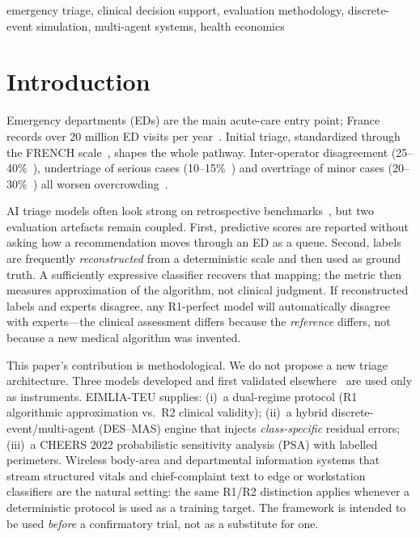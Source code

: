 \documentclass[conference]{IEEEtran}
\begin{document}
\begin{IEEEkeywords}
emergency triage, clinical decision support, evaluation methodology, discrete-event simulation, multi-agent systems, health economics
\end{IEEEkeywords}

\section{Introduction}
Emergency departments (EDs) are the main acute-care entry point; France records over 20 million ED visits per year~\cite{drees2023}. Initial triage, standardized through the FRENCH scale~\cite{taboulet2009,taboulet2019}, shapes the whole pathway. Inter-operator disagreement (25--40\%~\cite{farrohknia2011,parenti2014,zaboli2024}), undertriage of serious cases (10--15\%~\cite{ebrahimi2015,sax2026}) and overtriage of minor cases (20--30\%~\cite{christ2010}) all worsen overcrowding~\cite{demoly2025,moll2010}.

AI triage models often look strong on retrospective benchmarks~\cite{levin2018,hong2018,klang2020}, but two evaluation artefacts remain coupled. First, predictive scores are reported without asking how a recommendation moves through an ED as a queue. Second, labels are frequently \emph{reconstructed} from a deterministic scale and then used as ground truth. A sufficiently expressive classifier recovers that mapping; the metric then measures approximation of the algorithm, not clinical judgment. If reconstructed labels and experts disagree, any R1-perfect model will automatically disagree with experts---the clinical assessment differs because the \emph{reference} differs, not because a new medical algorithm was invented.

This paper's contribution is methodological. We do not propose a new triage architecture. Three models developed and first validated elsewhere~\cite{lansiaux2025bdcat,lansiaux2026jmir} are used only as instruments. EIMLIA-TEU supplies: (i)~a dual-regime protocol (R1 algorithmic approximation vs.\ R2 clinical validity); (ii)~a hybrid discrete-event/multi-agent (DES--MAS) engine that injects \emph{class-specific} residual errors; (iii)~a CHEERS 2022 probabilistic sensitivity analysis (PSA) with labelled perimeters. Wireless body-area and departmental information systems that stream structured vitals and chief-complaint text to edge or workstation classifiers are the natural setting: the same R1/R2 distinction applies whenever a deterministic protocol is used as a training target. The framework is intended to be used \emph{before} a confirmatory trial, not as a substitute for one.
\end{document}
